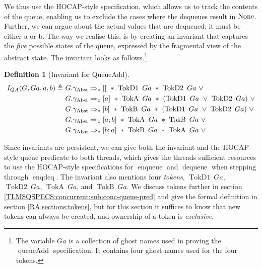 \documentclass[a4paper, 10pt]{report}
\theoremstyle{definition}
\newtheorem{definition}{Definition}[section]
\newcommand{\enqueue}{\operatorname{enqueue}}
\newcommand{\dequeue}{\operatorname{dequeue}}
\newcommand{\enqdeq}{\operatorname{enqdeq}}
\newcommand{\queueAdd}{\operatorname{queueAdd}}
\newcommand{\QueueAddInvariant}{I_{QA}}
\newcommand{\Qg}{G}
\newcommand{\QAg}{Ga}
\newcommand{\gabst}{\gname_{\mathrm{Abst}}}
\newcommand{\TokDo}[1]{\operatorname{TokD1} ~ #1}
\newcommand{\TokDoQAg}{\TokDo{\QAg}}
\newcommand{\TokDt}[1]{\operatorname{TokD2} ~ #1}
\newcommand{\TokDtQAg}{\TokDt{\QAg}}
\newcommand{\TokA}[1]{\operatorname{TokA} ~ #1}
\newcommand{\TokAQAg}{\TokA{\QAg}}
\newcommand{\TokB}[1]{\operatorname{TokB} ~ #1}
\newcommand{\TokBQAg}{\TokB{\QAg}}
\newcommand{\abstractstatefullfrag}[2]{#1 \Mapsto_{\circ} #2}
\begin{document}
We thus use the HOCAP-style specification, which allows us to track the contents of the queue, enabling us to exclude the cases where the dequeues result in $\operatorname{None}$. Further, we can argue about the actual values that are dequeued; it must be either a or b. The way we realise this, is by creating an invariant that captures the \textit{five} possible states of the queue, expressed by the fragmental view of the abstract state. The invariant looks as follows.\footnote{The variable $\QAg$ is a collection of ghost names used in proving the $\queueAdd$ specification. It contains four ghost names used for the four tokens.}
\begin{definition}[Invariant for QueueAdd]\label{QueueSpecs:queueadd:invariant}
  \begin{align*}
    \QueueAddInvariant(\Qg, \QAg, a, b) \eqdef~
    &\abstractstatefullfrag{\Qg.\gabst}{[]}~\star~\TokDoQAg~\star~\TokDtQAg~\lor\\
    &\abstractstatefullfrag{\Qg.\gabst}{[a]}~\star~\TokAQAg~\star~(\TokDoQAg~\lor~\TokDtQAg)~\lor\\
    &\abstractstatefullfrag{\Qg.\gabst}{[b]}~\star~\TokBQAg~\star~(\TokDoQAg~\lor~\TokDtQAg)~\lor\\
    &\abstractstatefullfrag{\Qg.\gabst}{[a; b]}~\star~\TokAQAg~\star~\TokBQAg~\lor\\
    &\abstractstatefullfrag{\Qg.\gabst}{[b; a]}~\star~\TokBQAg~\star~\TokAQAg~\lor
  \end{align*}
\end{definition}
Since invariants are persistent, we can give both the invariant and the HOCAP-style queue predicate to both threads, which gives the threads sufficient resources to use the HOCAP-style specifications for $\enqueue$ and $\dequeue$ when stepping through $\enqdeq$. The invariant also mentions four \textit{tokens}, $\TokDoQAg$, $\TokDtQAg$, $\TokAQAg$, and $\TokBQAg$. We discuss tokens further in section \ref{TLMSQSPECS:concurrent:sub:conc-queue-pred} and give the formal definition in section \ref{RA:sections:tokens}, but for this section it suffices to know that new tokens can always be created, and ownership of a token is \textit{exclusive}.\\
\end{document}
